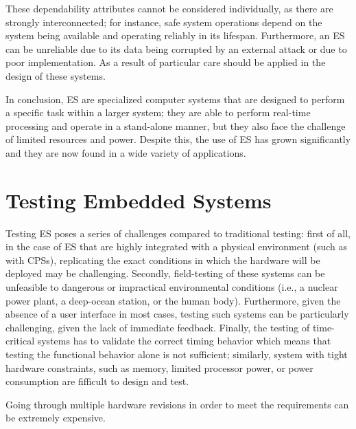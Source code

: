 These dependability attributes cannot be considered individually, as there are strongly interconnected; for instance, safe system operations depend on the system being available and operating reliably in its lifespan. Furthermore, an ES can be unreliable due to its data being corrupted by an external attack or due to poor implementation. As a result of particular care should be applied in the design of these systems. 


In conclusion, ES are specialized computer systems that are designed to perform a specific task within a larger system; they are able to perform real-time processing and operate in a stand-alone manner, but they also face the challenge of limited resources and power. Despite this, the use of ES has grown significantly and they are now found in a wide variety of applications.


\section{Testing Embedded Systems}
Testing ES poses a series of challenges compared to traditional testing: first of all, in the case of ES that are highly integrated with a physical environment (such as with CPSs), replicating the exact conditions in which the hardware will be deployed may be challenging. Secondly, field-testing of these systems can be unfeasible to dangerous or impractical environmental conditions (i.e., a nuclear power plant, a deep-ocean station, or the human body). Furthermore, given the absence of a user interface in most cases, testing such systems can be particularly challenging, given the lack of immediate feedback. Finally, the testing of time-critical systems has to validate the correct timing behavior which means that testing the functional behavior alone is not sufficient; similarly, system with tight hardware constraints, such as memory, limited processor power, or power consumption are fifficult to design and test.

Going through multiple hardware revisions in order to meet the requirements can be extremely expensive.

